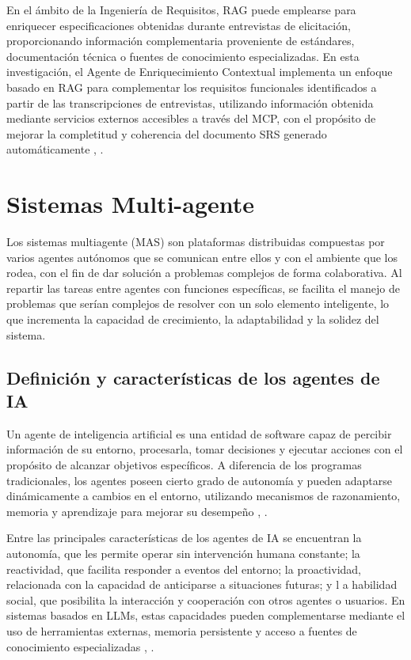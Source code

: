 En el ámbito de la Ingeniería de Requisitos, RAG puede emplearse para enriquecer especificaciones obtenidas durante entrevistas de elicitación, 
proporcionando información complementaria proveniente de estándares, documentación técnica o fuentes de conocimiento especializadas. En esta 
investigación, el Agente de Enriquecimiento Contextual implementa un enfoque basado en RAG para complementar los requisitos funcionales identificados 
a partir de las transcripciones de entrevistas, utilizando información obtenida mediante servicios externos accesibles a través del MCP, con el propósito de 
mejorar la completitud y coherencia del documento SRS generado automáticamente \cite{lewis2020retrieval}, \cite{hemmat2025research}.



\section{Sistemas Multi-agente }

Los sistemas multiagente (MAS) son plataformas distribuidas compuestas por varios agentes autónomos que se comunican entre ellos y con el 
ambiente que los rodea, con el fin de dar solución a problemas complejos de forma colaborativa. Al repartir las tareas entre agentes con 
funciones específicas, se facilita el manejo de problemas que serían complejos de resolver con un solo elemento inteligente, lo que incrementa 
la capacidad de crecimiento, la adaptabilidad y la solidez del sistema.


\subsection{Definición y características de los agentes de IA}
Un agente de inteligencia artificial es una entidad de software capaz de percibir información de su entorno, procesarla, tomar decisiones 
y ejecutar acciones con el propósito de alcanzar objetivos específicos. A diferencia de los programas tradicionales, los agentes poseen 
cierto grado de autonomía y pueden adaptarse dinámicamente a cambios en el entorno, utilizando mecanismos de razonamiento, memoria y 
aprendizaje para mejorar su desempeño \cite{Guo2024}, \cite{zhang2025survey}.

Entre las principales características de los agentes de IA se encuentran la autonomía, que les permite operar sin intervención humana constante; 
la reactividad, que facilita responder a eventos del entorno; la proactividad, relacionada con la capacidad de anticiparse a situaciones futuras; y l
a habilidad social, que posibilita la interacción y cooperación con otros agentes o usuarios. En sistemas basados en LLMs, estas capacidades pueden 
complementarse mediante el uso de herramientas externas, memoria persistente y acceso a fuentes de conocimiento especializadas \cite{zhang2025survey}, \cite{durante2024agent}.

